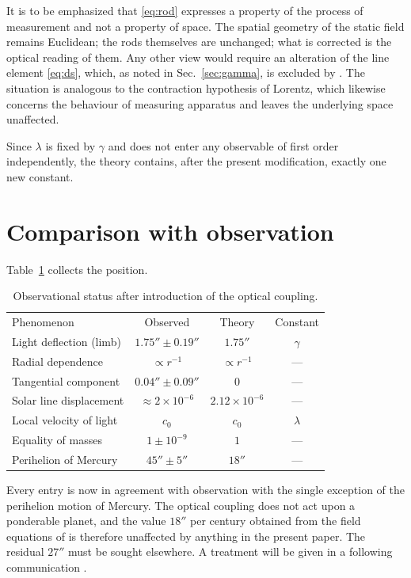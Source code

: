 \documentclass[aps,prd,reprint,amsmath,amssymb,nofootinbib,longbibliography]{revtex4-2}
\begin{document}
It is to be emphasized that \eqref{eq:rod} expresses a property of the process of measurement and
not a property of space. The spatial geometry of the static field remains Euclidean; the rods
themselves are unchanged; what is corrected is the optical reading of them. Any other view would
require an alteration of the line element \eqref{eq:ds}, which, as noted in Sec.~\ref{sec:gamma}, is
excluded by \cite{paperD}. The situation is analogous to the contraction hypothesis of Lorentz,
which likewise concerns the behaviour of measuring apparatus and leaves the underlying space
unaffected.

Since $\lambda$ is fixed by $\gamma$ and does not enter any observable of first order independently,
the theory contains, after the present modification, exactly one new constant.

\section{Comparison with observation}

Table~\ref{tab:comp} collects the position.

\begin{table}[t]
\caption{Observational status after introduction of the optical coupling.}
\label{tab:comp}
\begin{ruledtabular}
\begin{tabular}{lccc}
Phenomenon & Observed & Theory & Constant \\
\colrule
Light deflection (limb) & $1.75'' \pm 0.19''$ & $1.75''$ & $\gamma$ \\
Radial dependence & $\propto r^{-1}$ & $\propto r^{-1}$ & --- \\
Tangential component & $0.04'' \pm 0.09''$ & $0$ & --- \\
Solar line displacement & $\approx 2 \times 10^{-6}$ & $2.12\times 10^{-6}$ & --- \\
Local velocity of light & $c_0$ & $c_0$ & $\lambda$ \\
Equality of masses & $1 \pm 10^{-9}$ & $1$ & --- \\
Perihelion of Mercury & $45'' \pm 5''$ & $18''$ & --- \\
\end{tabular}
\end{ruledtabular}
\end{table}

Every entry is now in agreement with observation with the single exception of the perihelion motion
of Mercury. The optical coupling does not act upon a ponderable planet, and the value $18''$ per
century obtained from the field equations of \cite{eingross1913} is therefore unaffected by anything
in the present paper. The residual $27''$ must be sought elsewhere. A treatment will be given in a
following communication \cite{paperC}.
\end{document}

